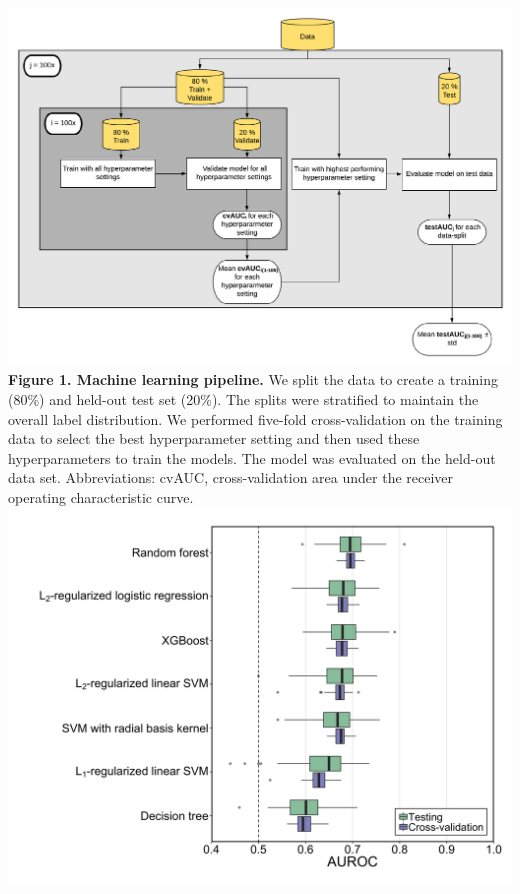 \documentclass[11pt,]{article}
\begin{document}
\includegraphics{Figure_1} \textbf{Figure 1. Machine learning pipeline.
} We split the data to create a training (80\%) and held-out test set
(20\%). The splits were stratified to maintain the overall label
distribution. We performed five-fold cross-validation on the training
data to select the best hyperparameter setting and then used these
hyperparameters to train the models. The model was evaluated on the
held-out data set. Abbreviations: cvAUC, cross-validation area under the
receiver operating characteristic curve. \newpage
\includegraphics{Figure_2.png}
\end{document}
